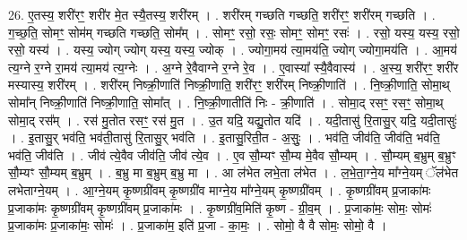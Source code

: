 \documentclass[17pt]{extarticle}
\begin{document}
26. ए॒तस्य॒ शरी॑रꣳ॒॒ शरी॑र मे॒त स्यै॒तस्य॒ शरी॑रम् । . शरी॑रम् गच्छति गच्छति॒ शरी॑रꣳ॒॒ शरी॑रम् गच्छति । . ग॒च्छ॒ति॒ सोमꣳ॒॒ सोम॑म् गच्छति गच्छति॒ सोम᳚म् । . सोमꣳ॒॒ रसो॒ रसः॒ सोमꣳ॒॒ सोमꣳ॒॒ रसः॑ । . रसो॒ यस्य॒ यस्य॒ रसो॒ रसो॒ यस्य॑ । . यस्य॒ ज्योग् ज्योग् यस्य॒ यस्य॒ ज्योक् । . ज्योगा॒मय॑ त्या॒मय॑ति॒ ज्योग् ज्योगा॒मय॑ति । . आ॒मय॑ त्य॒ग्ने र॒ग्ने रा॒मय॑ त्या॒मय॑ त्य॒ग्नेः । . अ॒ग्ने रे॒वैवाग्ने र॒ग्ने रे॒व । . ए॒वास्या᳚ स्यै॒वैवास्य॑ । . अ॒स्य॒ शरी॑रꣳ॒॒ शरी॑र मस्यास्य॒ शरी॑रम् । . शरी॑रम् निष्क्री॒णाति॑ निष्क्री॒णाति॒ शरी॑रꣳ॒॒ शरी॑रम् निष्क्री॒णाति॑ । . नि॒ष्क्री॒णाति॒ सोमा॒थ् सोमा᳚न् निष्क्री॒णाति॑ निष्क्री॒णाति॒ सोमा᳚त् । . नि॒ष्क्री॒णातीति॑ निः - क्री॒णाति॑ । . सोमा॒द् रसꣳ॒॒ रसꣳ॒॒ सोमा॒थ् सोमा॒द् रस᳚म् । . रस॑ मु॒तोत रसꣳ॒॒ रस॑ मु॒त । . उ॒त यदि॒ यद्यु॒तोत यदि॑ । . यदी॒तासु॑ रि॒तासु॒र् यदि॒ यदी॒तासुः॑ । . इ॒तासु॒र् भव॑ति॒ भव॑ती॒तासु॑ रि॒तासु॒र् भव॑ति । . इ॒तासु॒रिती॒त - अ॒सुः॒ । . भव॑ति॒ जीव॑ति॒ जीव॑ति॒ भव॑ति॒ भव॑ति॒ जीव॑ति । . जीव॑ त्ये॒वैव जीव॑ति॒ जीव॑ त्ये॒व । . ए॒व सौ॒म्यꣳ सौ॒म्य मे॒वैव सौ॒म्यम् । . सौ॒म्यम् ब॒भ्रुम् ब॒भ्रुꣳ सौ॒म्यꣳ सौ॒म्यम् ब॒भ्रुम् । . ब॒भ्रु मा ब॒भ्रुम् ब॒भ्रु मा । . आ ल॑भेत लभे॒ता ल॑भेत । . ल॒भे॒ता॒ग्ने॒य मा᳚ग्ने॒यम् ॅल॑भेत लभेताग्ने॒यम् । . आ॒ग्ने॒यम् कृ॒ष्णग्री॑वम् कृ॒ष्णग्री॑व माग्ने॒य मा᳚ग्ने॒यम् कृ॒ष्णग्री॑वम् । . कृ॒ष्णग्री॑वम् प्र॒जाका॑मः प्र॒जाका॑मः कृ॒ष्णग्री॑वम् कृ॒ष्णग्री॑वम् प्र॒जाका॑मः । . कृ॒ष्णग्री॑व॒मिति॑ कृ॒ष्ण - ग्री॒व॒म् । . प्र॒जाका॑मः॒ सोमः॒ सोमः॑ प्र॒जाका॑मः प्र॒जाका॑मः॒ सोमः॑ । . प्र॒जाका॑म॒ इति॑ प्र॒जा - का॒मः॒ । . सोमो॒ वै वै सोमः॒ सोमो॒ वै । \newline
\end{document}
